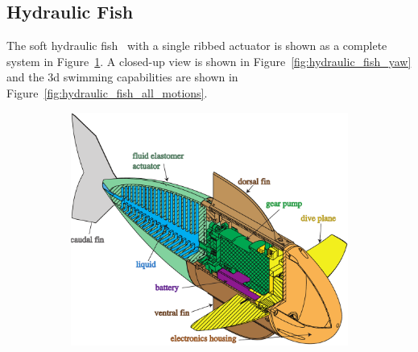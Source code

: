 \subsection{Hydraulic Fish}
\label{subsec:Locomotion, Hydraulic Fish}
The soft hydraulic fish~\cite{katzschmann2014hydraulic} with a single ribbed actuator is shown as a complete system in Figure~\ref{fig:hydraulic_fish_system_overview}. A closed-up view is shown in Figure~\ref{fig:hydraulic_fish_yaw} and the 3d swimming capabilities are shown in Figure~\ref{fig:hydraulic_fish_all_motions}.

\begin{figure}[htb]
        \centering
        \begin{subfigure}[b]{0.48\columnwidth}
            \centering
           \includegraphics[width=1\columnwidth]{figures/locomotion/hydraulic_fish_system_overview.pdf} 
           \caption{}
            \label{fig:hydraulic_fish_system_overview}
        \end{subfigure}
        \begin{subfigure}[b]{0.48\columnwidth}
            \centering

\end{subfigure}
\end{figure}
